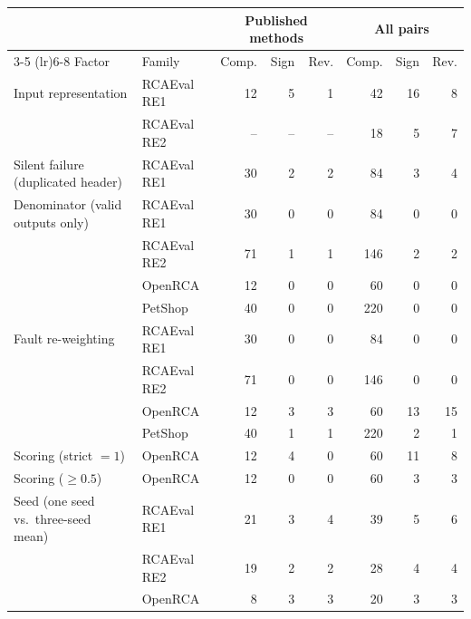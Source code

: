 \setlength{\tabcolsep}{4pt}
\begin{tabular*}{\textwidth}{@{\extracolsep{\fill}}llrrrrrr@{}}
\toprule
 & & \multicolumn{3}{c}{Published methods} & \multicolumn{3}{c}{All pairs} \\
\cmidrule(lr){3-5} \cmidrule(lr){6-8}
Factor & Family & Comp. & Sign & Rev. & Comp. & Sign & Rev. \\
\midrule
Input representation & RCAEval RE1 & 12 & 5 & 1 & 42 & 16 & 8 \\
 & RCAEval RE2 & -- & -- & -- & 18 & 5 & 7 \\
\addlinespace
Silent failure (duplicated header) & RCAEval RE1 & 30 & 2 & 2 & 84 & 3 & 4 \\
\addlinespace
Denominator (valid outputs only) & RCAEval RE1 & 30 & 0 & 0 & 84 & 0 & 0 \\
 & RCAEval RE2 & 71 & 1 & 1 & 146 & 2 & 2 \\
 & OpenRCA & 12 & 0 & 0 & 60 & 0 & 0 \\
 & PetShop & 40 & 0 & 0 & 220 & 0 & 0 \\
\addlinespace
Fault re-weighting & RCAEval RE1 & 30 & 0 & 0 & 84 & 0 & 0 \\
 & RCAEval RE2 & 71 & 0 & 0 & 146 & 0 & 0 \\
 & OpenRCA & 12 & 3 & 3 & 60 & 13 & 15 \\
 & PetShop & 40 & 1 & 1 & 220 & 2 & 1 \\
\addlinespace
Scoring (strict $=1$) & OpenRCA & 12 & 4 & 0 & 60 & 11 & 8 \\
\addlinespace
Scoring ($\geq 0.5$) & OpenRCA & 12 & 0 & 0 & 60 & 3 & 3 \\
\addlinespace
Seed (one seed vs.\ three-seed mean) & RCAEval RE1 & 21 & 3 & 4 & 39 & 5 & 6 \\
 & RCAEval RE2 & 19 & 2 & 2 & 28 & 4 & 4 \\
 & OpenRCA & 8 & 3 & 3 & 20 & 3 & 3 \\
\bottomrule
\end{tabular*}
